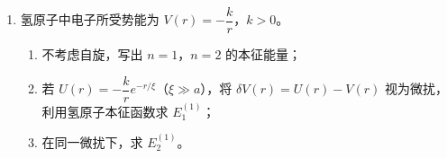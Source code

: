\begin{enumerate}
{\begin{enumerate}
		\item 引入 $c=\hat{C}/\sqrt{2}=(\hat{B}+i\hat{A})/\sqrt{2}$，$d=(\hat{B}-i\hat{A})/\sqrt{2}$，则
		\begin{align*}
			[c,c^{\dagger}]=\frac{1}{2}[\hat{C},\hat{C}^{\dagger}]=1,\quad [d,d^{\dagger}]=1,\quad [c,d^{\dagger}]=0
		\end{align*}
		且由 $c=(\hat{B}+i\hat{A})/\sqrt{2}$，$d=(\hat{B}-i\hat{A})/\sqrt{2}$ 反解得
		\begin{align*}
			\hat{A}=\frac{c-d}{i\sqrt{2}}=\frac{i(d-c)}{\sqrt{2}},\quad \hat{B}=\frac{c+d}{\sqrt{2}}
		\end{align*}
		验证：
		\begin{align*}
			\hat{A}^{\dagger}\hat{A}&=\frac{(c^{\dagger}-d^{\dagger})(c-d)}{(i\sqrt{2})(-i\sqrt{2})}=\frac{c^{\dagger}c-c^{\dagger}d-d^{\dagger}c+d^{\dagger}d}{2}\\
			\hat{B}^{\dagger}\hat{B}&=\frac{(c^{\dagger}+d^{\dagger})(c+d)}{2}=\frac{c^{\dagger}c+c^{\dagger}d+d^{\dagger}c+d^{\dagger}d}{2}
		\end{align*}
		相加得
		\begin{align*}
			\hat{A}^{\dagger}\hat{A}+\hat{B}^{\dagger}\hat{B}=c^{\dagger}c+d^{\dagger}d=N_c+N_d
		\end{align*}
		而 $\hat{C}^{\dagger}\hat{C}=2c^{\dagger}c=2N_c$。因此
		\begin{align*}
			[\hat{C}^{\dagger}\hat{C},\hat{A}^{\dagger}\hat{A}+\hat{B}^{\dagger}\hat{B}]
			=[2N_c,N_c+N_d]=2[N_c,N_c]+2[N_c,N_d]=0
		\end{align*}

		\item 由上可知
		\begin{align*}
			\hat{L}_z&=\hbar(\hat{C}^{\dagger}\hat{C}-\hat{A}^{\dagger}\hat{A}-\hat{B}^{\dagger}\hat{B})\\
			&=\hbar(2N_c-N_c-N_d)=\hbar(N_c-N_d)
		\end{align*}
		可直接验证 $\hat{L}_z=x\hat{p}_y-y\hat{p}_x$ 即轨道角动量 $z$ 分量。

		$N_c$ 和 $N_d$ 的本征值分别为非负整数 $n_c,n_d$，故 $\hat{L}_z$ 的本征值为
		\begin{align*}
			L_z=m\hbar,\quad m=n_c-n_d\in\mathbb{Z}
		\end{align*}
		在给定总量子数 $N=n_c+n_d$ 的能级上，$m=-N,-N+2,\ldots,N-2,N$。
	\end{enumerate}
	}

	\item
	氢原子中电子所受势能为 $V(r)=-\dfrac{k}{r}$，$k>0$。
	\begin{enumerate}
		\item 不考虑自旋，写出 $n=1$，$n=2$ 的本征能量；
		\item 若 $U(r)=-\dfrac{k}{r}e^{-r/\xi}$（$\xi\gg a$），将 $\delta V(r)=U(r)-V(r)$ 视为微扰，利用氢原子本征函数求 $E_1^{(1)}$；
		\item 在同一微扰下，求 $E_2^{(1)}$。
	\end{enumerate}


\end{enumerate}
